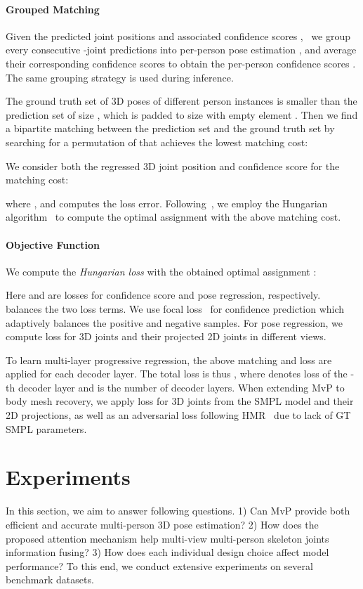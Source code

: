 \documentclass{article}
\begin{document}
\paragraph{Grouped Matching}
Given the predicted joint positions  and associated confidence scores , \
{we group every consecutive -joint predictions into per-person pose estimation , and average their corresponding confidence scores to obtain the per-person confidence scores .} The same grouping strategy is used during inference.

 
The ground truth set  of 3D poses of different person instances  
is smaller than the prediction set of size , which is padded to size  with empty element . Then we find a bipartite matching between the prediction set and the ground truth set by searching for a permutation of  that achieves the lowest matching cost:

We consider both the regressed 3D joint position and confidence score for the matching cost:

where , and  computes the  loss error. 
Following~\cite{carion2020end,sutskever2014sequence}, we employ the Hungarian algorithm~\cite{kuhn1955hungarian} to compute the optimal assignment  with the above matching cost.


\paragraph{Objective Function}
We compute the \textit{Hungarian loss} with the obtained optimal assignment : 

Here  and  are losses for confidence score and pose regression, respectively.  balances the two loss terms. We use focal loss~\cite{lin2017focal} for confidence prediction which adaptively balances the positive and negative samples.
{For pose regression, we compute  loss for 3D joints and their projected 2D joints in different views. 
}

{To learn multi-layer progressive regression, the above matching and loss are applied for each decoder layer. The total loss is thus , where  denotes loss of the -th decoder layer and  is the number of decoder layers. When extending MvP to body mesh recovery, we apply  loss for 3D joints from the SMPL model and their 2D projections, as well as an adversarial loss following HMR~\cite{hmrKanazawa17,jiang2020coherent,zhang2021bmp} due to lack of GT SMPL parameters.}



\section{Experiments}
\label{experiments}
In this section, we aim to answer following questions.
1) Can MvP provide both efficient and accurate 
multi-person 3D pose estimation?
2) How does the proposed attention mechanism help multi-view multi-person skeleton joints information fusing?
3) How does each individual design choice affect model performance?
To this end, we conduct extensive experiments on several benchmark datasets.
\end{document}
